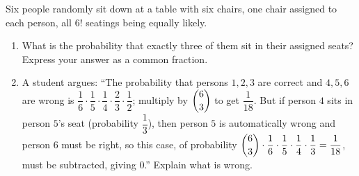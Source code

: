 Six people randomly sit down at a table with six chairs, one chair assigned to each person, all $6!$ seatings being equally likely.
\begin{enumerate}
\item[(a)] What is the probability that exactly three of them sit in their assigned seats? Express your answer as a common fraction.
\item[(b)] A student argues: ``The probability that persons $1,2,3$ are correct and $4,5,6$ are wrong is $\dfrac{1}{6}\cdot\dfrac{1}{5}\cdot\dfrac{1}{4}\cdot\dfrac{2}{3}\cdot\dfrac{1}{2}$; multiply by $\dbinom63$ to get $\dfrac{1}{18}$. But if person $4$ sits in person $5$'s seat (probability $\dfrac{1}{3}$), then person $5$ is automatically wrong and person $6$ must be right, so this case, of probability $\dbinom63\cdot\dfrac{1}{6}\cdot\dfrac{1}{5}\cdot\dfrac{1}{4}\cdot\dfrac{1}{3}=\dfrac{1}{18}$, must be subtracted, giving $0$.'' Explain what is wrong.
\end{enumerate}
